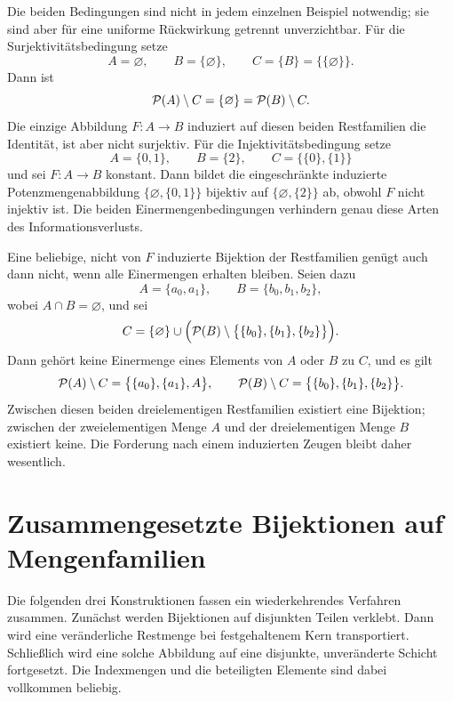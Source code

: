 \documentclass[main.tex]{subfiles}
\begin{document}
\begin{remark}
Die beiden Bedingungen sind nicht in jedem einzelnen Beispiel notwendig;
sie sind aber für eine uniforme Rückwirkung getrennt unverzichtbar.  Für die
Surjektivitätsbedingung setze
\[
  A=\varnothing,\qquad B=\{\varnothing\},\qquad
  C=\{B\}=\bigl\{\{\varnothing\}\bigr\}.
\]
Dann ist
\[
  \mathcal{P}(A)\setminus C
  =\{\varnothing\}
  =\mathcal{P}(B)\setminus C.
\]
Die einzige Abbildung \(F\colon A\to B\) induziert auf diesen beiden
Restfamilien die Identität, ist aber nicht surjektiv.  Für die
Injektivitätsbedingung setze
\[
  A=\{0,1\},\qquad B=\{2\},\qquad
  C=\bigl\{\{0\},\{1\}\bigr\}
\]
und sei \(F\colon A\to B\) konstant.  Dann bildet die eingeschränkte
induzierte Potenzmengenabbildung
\(\{\varnothing,\{0,1\}\}\) bijektiv auf
\(\{\varnothing,\{2\}\}\) ab, obwohl \(F\) nicht injektiv ist.  Die beiden
Einermengenbedingungen verhindern genau diese Arten des Informationsverlusts.

Eine beliebige, nicht von \(F\) induzierte Bijektion der Restfamilien genügt
auch dann nicht, wenn alle Einermengen erhalten bleiben.  Seien dazu
\[
  A=\{a_0,a_1\},\qquad B=\{b_0,b_1,b_2\},
\]
wobei \(A\cap B=\varnothing\), und sei
\[
  C=\{\varnothing\}\cup
    \Bigl(\mathcal{P}(B)\setminus
      \bigl\{\{b_0\},\{b_1\},\{b_2\}\bigr\}\Bigr).
\]
Dann gehört keine Einermenge eines Elements von \(A\) oder \(B\) zu \(C\),
und es gilt
\[
  \mathcal{P}(A)\setminus C
    =\bigl\{\{a_0\},\{a_1\},A\bigr\},\qquad
  \mathcal{P}(B)\setminus C
    =\bigl\{\{b_0\},\{b_1\},\{b_2\}\bigr\}.
\]
Zwischen diesen beiden dreielementigen Restfamilien existiert eine Bijektion;
zwischen der zweielementigen Menge \(A\) und der dreielementigen Menge \(B\)
existiert keine.  Die Forderung nach einem induzierten Zeugen bleibt daher
wesentlich.
\end{remark}

\section{Zusammengesetzte Bijektionen auf Mengenfamilien}

Die folgenden drei Konstruktionen fassen ein wiederkehrendes Verfahren
zusammen.  Zunächst werden Bijektionen auf disjunkten Teilen verklebt.  Dann
wird eine veränderliche Restmenge bei festgehaltenem Kern transportiert.
Schließlich wird eine solche Abbildung auf eine disjunkte, unveränderte
Schicht fortgesetzt.  Die Indexmengen und die beteiligten Elemente sind dabei
vollkommen beliebig.
\end{document}
